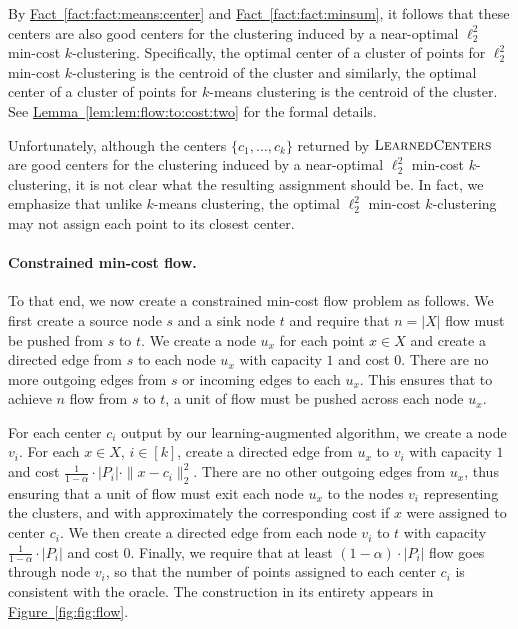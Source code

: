 \documentclass[11pt]{article}
\newcommand{\namedref}[2]{\hyperref[#2]{#1~\ref*{#2}}}
\newcommand{\lemref}[1]{\namedref{Lemma}{lem:#1}}
\newcommand{\factref}[1]{\namedref{Fact}{fact:#1}}
\newcommand{\figref}[1]{\namedref{Figure}{fig:#1}}
\def \LearnedCenters    {\mdef{\textsc{LearnedCenters}}}
\newcommand{\mdef}[1]{{\ensuremath{#1}}\xspace}  %
\begin{document}
By \factref{fact:means:center} and \factref{fact:minsum}, it follows that these centers are also good centers for the clustering induced by a near-optimal $\ell_2^2$ min-cost $k$-clustering.  
Specifically, the optimal center of a cluster of points for $\ell_2^2$ min-cost $k$-clustering is the centroid of the cluster and similarly, the optimal center of a cluster of points for $k$-means clustering is the centroid of the cluster. 
See \lemref{lem:flow:to:cost:two} for the formal details. 

Unfortunately, although the centers $\{c_1,\ldots,c_k\}$ returned by $\LearnedCenters$ are good centers for the clustering induced by a near-optimal $\ell_2^2$ min-cost $k$-clustering, it is not clear what the resulting assignment should be. 
In fact, we emphasize that unlike $k$-means clustering, the optimal $\ell_2^2$ min-cost $k$-clustering may not assign each point to its closest center. 

\paragraph{Constrained min-cost flow.}
To that end, we now create a constrained min-cost flow problem as follows. 
We first create a source node $s$ and a sink node $t$ and require that $n=|X|$ flow must be pushed from $s$ to $t$. 
We create a node $u_x$ for each point $x\in X$ and create a directed edge from $s$ to each node $u_x$ with capacity $1$ and cost $0$. 
There are no more outgoing edges from $s$ or incoming edges to each $u_x$. 
This ensures that to achieve $n$ flow from $s$ to $t$, a unit of flow must be pushed across each node $u_x$. 

For each center $c_i$ output by our learning-augmented algorithm, we create a node $v_i$. 
For each $x\in X$, $i\in[k]$, create a directed edge from $u_x$ to $v_i$ with capacity $1$ and cost $\frac{1}{1-\alpha}\cdot|P_i|\cdot\|x-c_i\|_2^2$. 
There are no other outgoing edges from $u_x$, thus ensuring that a unit of flow must exit each node $u_x$ to the nodes $v_i$ representing the clusters, and with approximately the corresponding cost if $x$ were assigned to center $c_i$. 
We then create a directed edge from each node $v_i$ to $t$ with capacity $\frac{1}{1-\alpha}\cdot|P_i|$ and cost $0$. 
Finally, we require that at least $(1-\alpha)\cdot|P_i|$ flow goes through node $v_i$, so that the number of points assigned to each center $c_i$ is consistent with the oracle.  
The construction in its entirety appears in \figref{fig:flow}. 
\end{document}
